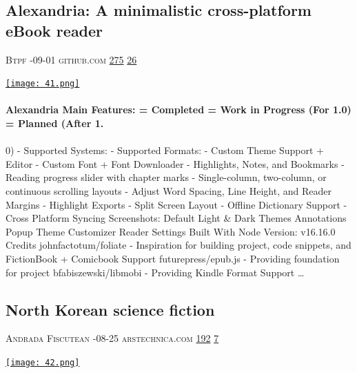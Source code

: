 \documentclass[10pt,a4paper]{article}
\begin{document}
\begin{multicols}{2}
\raggedcolumns
\noindent\begin{minipage}{\linewidth}
\medskip
\subsection{Alexandria: A minimalistic cross-platform eBook reader}
\textsc{\footnotesize
{\scriptsize\faUser}\space 
Btpf 
{\scriptsize\faCalendar}-09-01 
{\scriptsize\faGithub}\space 
github.com 
{\scriptsize\faThumbsOUp}\space 
\href{http://news.ycombinator.com/item?id=37303960\&utm\_term=comment}{275} 
{\scriptsize\faComments}\space 
\href{http://news.ycombinator.com/item?id=37303960\&utm\_term=comment}{26} 
}
\par\medskip\noindent
\href{https://github.com/btpf/Alexandria?utm\_source=hackernewsletter\&utm\_medium=email\&utm\_term=books}{
    \texttt{[image: 41.png]}
}
\end{minipage}
\paragraph{}
\textbf{Alexandria
Main Features:
= Completed = Work in Progress (For 1.0) = Planned (After 1.}
\paragraph{}
0)
- Supported Systems:
- Supported Formats:
- Custom Theme Support + Editor
- Custom Font + Font Downloader
- Highlights, Notes, and Bookmarks
- Reading progress slider with chapter marks
- Single-column, two-column, or continuous scrolling layouts
- Adjust Word Spacing, Line Height, and Reader Margins
- Highlight Exports
- Split Screen Layout
- Offline Dictionary Support
- Cross Platform Syncing
Screenshots:
Default Light \& Dark Themes
Annotations Popup
Theme Customizer
Reader Settings
Built With Node Version: v16.16.0
Credits
johnfactotum/foliate - Inspiration for building project, code snippets, and FictionBook + Comicbook Support
futurepress/epub.js - Providing foundation for project
bfabiszewski/libmobi - Providing Kindle Format Support
\dots\par
\noindent\begin{minipage}{\linewidth}
\medskip
\subsection{North Korean science fiction}
\textsc{\footnotesize
{\scriptsize\faUser}\space 
Andrada Fiscutean 
{\scriptsize\faCalendar}-08-25 
{\scriptsize\faGlobe}\space 
arstechnica.com 
{\scriptsize\faThumbsOUp}\space 
\href{http://news.ycombinator.com/item?id=37291007\&utm\_term=comment}{192} 
{\scriptsize\faComments}\space 
\href{http://news.ycombinator.com/item?id=37291007\&utm\_term=comment}{7} 
}
\par\medskip\noindent
\href{https://arstechnica.com/culture/2023/08/the-strange-secretive-world-of-north-korean-science-fiction/?utm\_source=hackernewsletter\&utm\_medium=email\&utm\_term=books}{
    \texttt{[image: 42.png]}
}
\end{minipage}

\end{multicols}
\end{document}

